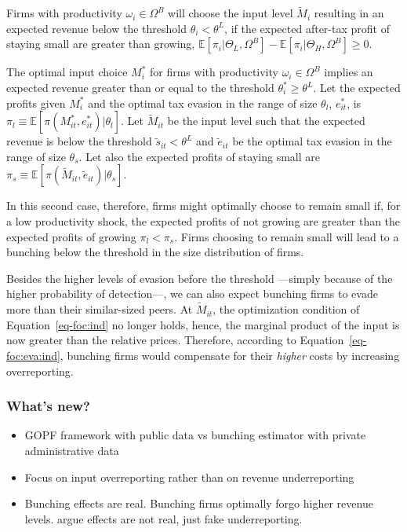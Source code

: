 \documentclass[
  12pt]{article}
\providecommand{\tightlist}{%
  \setlength{\itemsep}{0pt}\setlength{\parskip}{0pt}}\usepackage{longtable,booktabs,array}
\begin{document}
Firms with productivity \(\omega_{i}\in \Omega^B\) will choose the input
level \(\tilde{M}_{i}\) resulting in an expected revenue below the
threshold \(\theta_{i}<\theta^L\), if the expected after-tax profit of
staying small are greater than growing,
\(\mathbb{E}[\pi_{i}|\Theta_L, \Omega^B]-\mathbb{E}[\pi_{i}|\Theta_H, \Omega^B]\ge0\).

The optimal input choice \(M^*_{i}\) for firms with productivity
\(\omega_i\in\Omega^B\) implies an expected revenue greater than or
equal to the threshold \(\theta^*_{i}\ge \theta^L\). Let the expected
profits given \(M^*_{i}\) and the optimal tax evasion in the range of
size \(\theta_l\), \(e^*_{it}\), is
\(\pi_l\equiv\mathbb{E}[\pi(M^*_{it}, e^*_{it})|\theta_l]\). Let
\(\tilde{M}_{it}\) be the input level such that the expected revenue is
below the threshold \(\tilde{s}_{it}<\theta^L\) and \(\tilde{e}_{it}\)
be the optimal tax evasion in the range of size \(\theta_s\). Let also
the expected profits of staying small are
\(\pi_s\equiv\mathbb{E}[\pi(\tilde{M}_{it},\tilde{e}_{it})|\theta_s]\).

In this second case, therefore, firms might optimally choose to remain
small if, for a low productivity shock, the expected profits of not
growing are greater than the expected profits of growing
\(\pi_l<\pi_s\). Firms choosing to remain small will lead to a bunching
below the threshold in the size distribution of firms.

Besides the higher levels of evasion before the threshold ---simply
because of the higher probability of detection---, we can also expect
bunching firms to evade more than their similar-sized peers. At
\(\tilde{M}_{it}\), the optimization condition of
Equation~\ref{eq-foc:ind} no longer holds, hence, the marginal product
of the input is now greater than the relative prices. Therefore,
according to Equation~\ref{eq-foc:eva:ind}, bunching firms would
compensate for their \emph{higher} costs by increasing overreporting.

\hypertarget{whats-new}{%
\subsubsection{What's new?}\label{whats-new}}

\begin{itemize}
\tightlist
\item
  GOPF framework with public data vs bunching estimator with private
  administrative data
\item
  Focus on input overreporting rather than on revenue underreporting
\item
  Bunching effects are real. Bunching firms optimally forgo higher
  revenue levels. \citet{Almunia2018} argue effects are not real, just
  fake underreporting.
\end{itemize}
\end{document}
